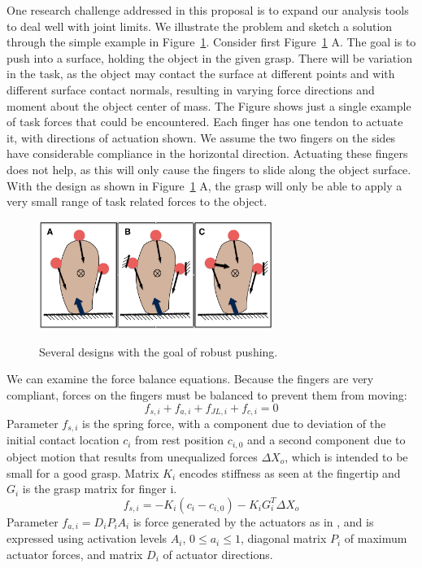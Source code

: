 One research challenge addressed in this proposal is to expand our analysis tools to deal well with joint limits.   We illustrate the problem and sketch a solution through the simple example in Figure~\ref{PushExample}.   Consider first Figure~\ref{PushExample} A.     The goal is to push into a surface, holding the object in the given grasp.   There will be variation in the task, as the object may contact the surface at different points and with different surface contact normals, resulting in varying force directions and moment about the object center of mass.   The Figure shows just a single example of task forces that could be encountered.    Each finger has one tendon to actuate it, with directions of actuation shown.    We assume the two fingers on the sides have considerable compliance in the horizontal direction.   Actuating these fingers does not help, as this will only cause the fingers to slide along the object surface.    With the design as shown in Figure~\ref{PushExample} A, the grasp will only be able to apply a very small range of task related forces to the object.

\begin{figure}
\begin{center}
{\includegraphics[width=3in]{./figs/pushExample.png}}
\end{center}
\vspace*{-0.2in}
\caption[]{Several designs with the goal of robust pushing.}
\label{PushExample}
\end{figure}

We can examine the force balance equations.   Because the fingers are very compliant, forces on the fingers must be balanced to prevent them from moving:
\begin{equation}
    f_{s, i} +     f_{a, i} +     f_{JL, i} +     f_{c, i} = 0
\end{equation}
Parameter $f_{s, i}$ is the spring force, with a component due to deviation of the initial contact location $c_i$ from rest position $c_{i, 0}$ and a second component due to object motion that results from unequalized forces $\Delta X_o$, which is intended to be small for a good grasp.   Matrix $K_i$ encodes stiffness as seen at the fingertip and $G_i$ is the grasp matrix for finger i.
\begin{equation}
 f_{s, i} = -K_i ( c_i - c_{i, 0}) - K_i G^T_i \Delta X_o
\end{equation}
Parameter $f_{a, i} = D_i P_i A_i$ is force generated by the actuators as in \cite{Li:graspDB07}, and is expressed using activation levels $A_i$, $0 \leq a_i \leq 1$, diagonal matrix $P_i$ of maximum actuator forces, and matrix $D_i$ of actuator directions.

